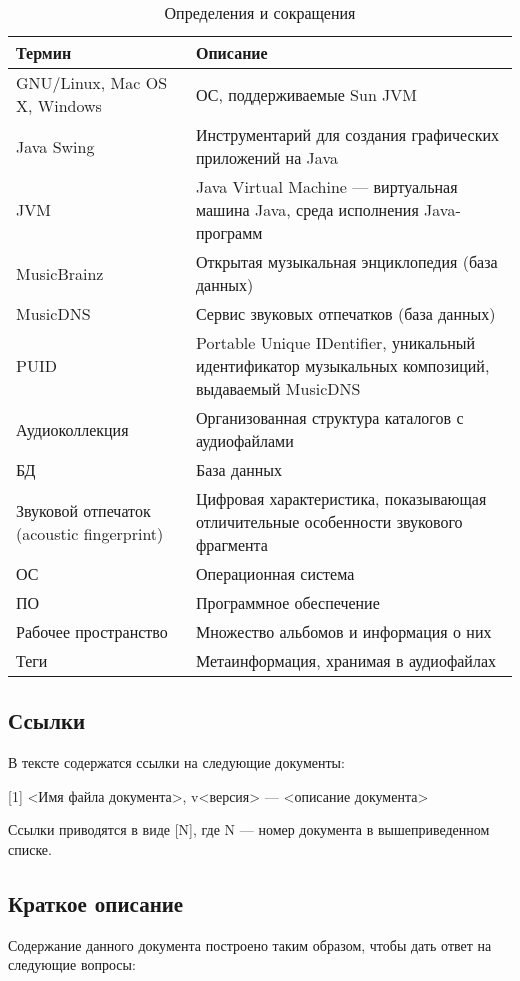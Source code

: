 \documentclass[pdftex,12pt,a4paper]{report}
\begin{document}
\begin{table}[h]  %
\caption{Определения и сокращения}
\begin{tabular}{|p{4cm}|p{10cm}|} \hline
Термин & Описание \\ \hline
GNU/Linux, Mac OS X, Windows & ОС, поддерживаемые Sun JVM \\ \hline
Java Swing & Инструментарий для создания графических приложений на Java \\ \hline
JVM & Java Virtual Machine --- виртуальная машина Java, среда исполнения Java-программ \\ \hline
MusicBrainz & Открытая музыкальная энциклопедия (база данных) \\ \hline
MusicDNS    & Сервис звуковых отпечатков (база данных) \\ \hline
PUID & Portable Unique IDentifier, уникальный идентификатор музыкальных композиций, выдаваемый MusicDNS \\ \hline
Аудиоколлекция & Организованная структура каталогов с аудиофайлами \\ \hline
БД & База данных \\ \hline
Звуковой отпечаток (acoustic fingerprint) & Цифровая характеристика, показывающая отличительные особенности звукового фрагмента \\ \hline
ОС & Операционная система \\ \hline
ПО & Программное обеспечение \\ \hline
Рабочее пространство & Множество альбомов и информация о них \\ \hline
Теги & Метаинформация, хранимая в аудиофайлах \\ \hline
\end{tabular}
\end{table}

\subsection{Ссылки}
В тексте содержатся ссылки на следующие документы:

[1]	<Имя файла документа>, v<версия> --- <описание документа>

Ссылки приводятся в виде [N], где N --- номер документа в вышеприведенном списке.

\subsection{Краткое описание}
Содержание данного документа построено таким образом, чтобы дать ответ на следующие вопросы:
\end{document}

